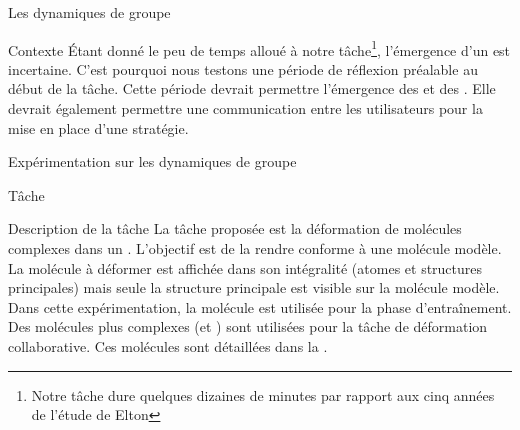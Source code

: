 \documentclass[myfrancais]{mythesis}
\begin{document}
\begin{mychapter}{Les dynamiques de groupe}
\begin{mysection}{Contexte}
			Étant donné le peu de temps alloué à notre tâche\footnote{Notre tâche dure quelques dizaines de minutes par rapport aux cinq années de l'étude de Elton }, l'émergence d'un  est incertaine.
			C'est pourquoi nous testons une période de réflexion préalable au début de la tâche.
			Cette période devrait permettre l'émergence des  et des .
			Elle devrait également permettre une communication entre les utilisateurs pour la mise en place d'une stratégie.
		\end{mysection}
		\begin{mysection}{Expérimentation sur les dynamiques de groupe}
			\begin{mysubsection}[sse-exp3-Tache]{Tâche}
				\begin{mysubsubsection}{Description de la tâche}
					La tâche proposée est la déformation de molécules complexes dans un .
					L'objectif est de la rendre conforme à une molécule modèle.
					La molécule à déformer est affichée dans son intégralité (atomes et structures principales) mais seule la structure principale est visible sur la molécule modèle.
					Dans cette expérimentation, la molécule \myTRPCAGE est utilisée pour la phase d'entraînement.
					Des molécules plus complexes (\myPrion et \myUbiquitin) sont utilisées pour la tâche de déformation collaborative.
					Ces molécules sont détaillées dans la .


\end{mysubsubsection}
\end{mysubsection}
\end{mysection}
\end{mychapter}
\end{document}
